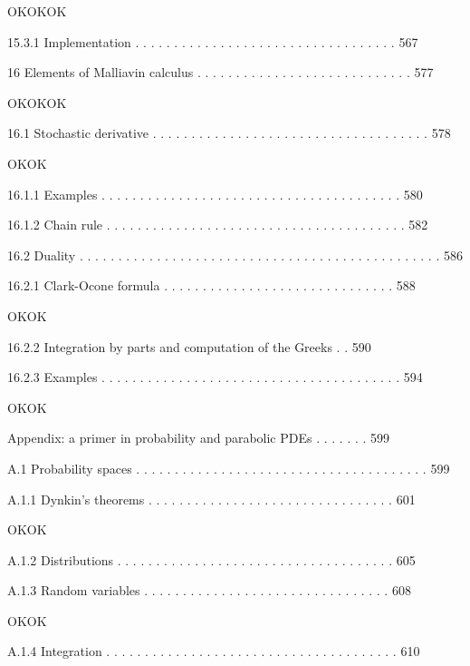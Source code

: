 OKOKOK

15.3.1 Implementation . . . . . . . . . . . . . . . . . . . . . . . . . . . . . . . . . . 567



16 Elements of Malliavin calculus . . . . . . . . . . . . . . . . . . . . . . . . . . . . 577

OKOKOK

16.1 Stochastic derivative . . . . . . . . . . . . . . . . . . . . . . . . . . . . . . . . . . . . 578

OKOK

16.1.1 Examples . . . . . . . . . . . . . . . . . . . . . . . . . . . . . . . . . . . . . . . 580



16.1.2 Chain rule . . . . . . . . . . . . . . . . . . . . . . . . . . . . . . . . . . . . . . . 582



16.2 Duality . . . . . . . . . . . . . . . . . . . . . . . . . . . . . . . . . . . . . . . . . . . . . . . 586



16.2.1 Clark-Ocone formula . . . . . . . . . . . . . . . . . . . . . . . . . . . . . . 588

OKOK

16.2.2 Integration by parts and computation of the Greeks . . 590



16.2.3 Examples . . . . . . . . . . . . . . . . . . . . . . . . . . . . . . . . . . . . . . . 594

OKOK

Appendix: a primer in probability and parabolic PDEs . . . . . . . 599



A.1 Probability spaces . . . . . . . . . . . . . . . . . . . . . . . . . . . . . . . . . . . . . . 599



A.1.1 Dynkin's theorems . . . . . . . . . . . . . . . . . . . . . . . . . . . . . . . . 601

OKOK

A.1.2 Distributions . . . . . . . . . . . . . . . . . . . . . . . . . . . . . . . . . . . . 605



A.1.3 Random variables . . . . . . . . . . . . . . . . . . . . . . . . . . . . . . . . 608

OKOK

A.1.4 Integration . . . . . . . . . . . . . . . . . . . . . . . . . . . . . . . . . . . . . . 610

